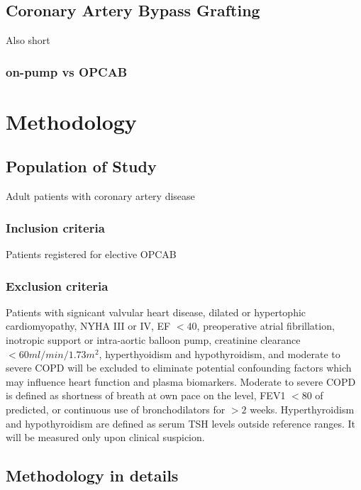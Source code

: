 \documentclass[14pt,a4paper,onecolumn]{article}
\begin{document}
\subsection{Coronary Artery Bypass Grafting}
Also short
\subsubsection{on-pump vs OPCAB}


\section{Methodology}

\subsection{Population of Study}

Adult patients with coronary artery disease

\subsubsection{Inclusion criteria}

Patients registered for elective OPCAB

\subsubsection{Exclusion criteria}

Patients with signicant valvular heart disease, dilated or hypertophic cardiomyopathy, NYHA III or IV, EF $< 40$, preoperative atrial fibrillation, inotropic support or intra-aortic balloon pump, creatinine clearance $< 60 ml/min/1.73 m^2$, hyperthyoidism and hypothyroidism, and moderate to severe COPD will be excluded to eliminate potential confounding factors which may influence heart function and plasma biomarkers.  Moderate to severe COPD is defined as shortness of breath at own pace on the level, FEV1 $< 80$ of predicted, or continuous use of bronchodilators for $> 2$ weeks.  Hyperthyroidism and hypothyroidism are defined as serum TSH levels outside reference ranges.  It will be measured only upon clinical suspicion.

\subsection{Methodology in details}
\end{document}
